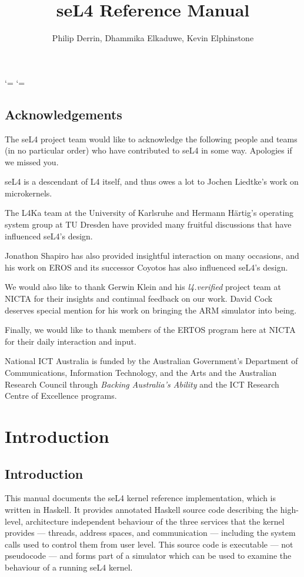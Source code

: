 \documentclass{ertos-book}
\title{seL4 Reference Manual}
\author{Philip Derrin, Dhammika Elkaduwe, Kevin Elphinstone}
\begin{document}
\catcode`\<=\active
\catcode`\>=\active

\chapter*{Acknowledgements}

The seL4 project team would like to acknowledge the following people
and teams (in no particular order) who have contributed to seL4 in
some way. Apologies if we missed you.

seL4 is a descendant of L4 itself, and thus owes a lot to Jochen
Liedtke's work on microkernels.

The L4Ka team at the University of Karlsruhe and Hermann H\"{a}rtig's
operating system group at TU Dresden have provided many fruitful
discussions that have influenced seL4's design.

Jonathon Shapiro has also provided insightful interaction on many
occasions, and his work on EROS and its successor Coyotos has also
influenced seL4's design.

We would also like to thank Gerwin Klein and his \emph{l4.verified}
 project team at NICTA for their insights and continual feedback on
 our work. David Cock deserves special mention for his work on
 bringing the ARM simulator into being.

Finally, we would like to thank members of the ERTOS program here at
NICTA for their daily interaction and input.

National ICT Australia is funded by the Australian Government's
Department of Communications, Information Technology, and the Arts and
the Australian Research Council through \emph{Backing Australia's
Ability} and the ICT Research Centre of Excellence programs.

\part{Introduction}

\chapter{Introduction}

This manual documents the seL4 kernel reference implementation, which
is written in Haskell. It provides annotated Haskell source code
describing the high-level, architecture independent behaviour of the
three services that the kernel provides --- threads, address spaces,
and communication --- including the system calls used to control them
from user level. This source code is executable --- not pseudocode ---
and forms part of a simulator which can be used to examine the
behaviour of a running seL4 kernel.
\end{document}
